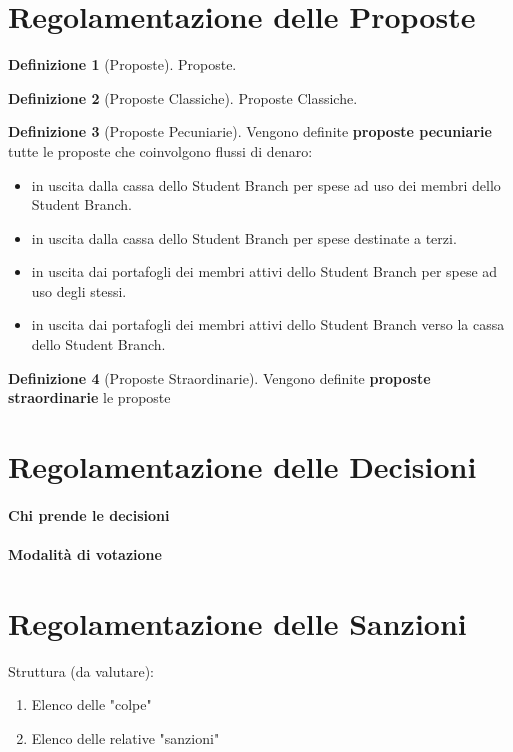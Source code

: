 \documentclass[]{article}
\theoremstyle{definition}
\newtheorem{defn}{Definizione}[section]
\begin{document}
\section{Regolamentazione delle Proposte}


\begin{defn}[Proposte]
	Proposte.
\end{defn}

\begin{defn}[Proposte Classiche]
	Proposte Classiche.
\end{defn}

\begin{defn}[Proposte Pecuniarie]
	Vengono definite \textbf{proposte pecuniarie} tutte le proposte che coinvolgono flussi di denaro:
	\begin{itemize}
		\item in uscita dalla cassa dello Student Branch per spese ad uso dei membri dello Student Branch.
		\item in uscita dalla cassa dello Student Branch per spese destinate a terzi.
		\item in uscita dai portafogli dei membri attivi dello Student Branch per spese ad uso degli stessi. %
		\item in uscita dai portafogli dei membri attivi dello Student Branch verso la cassa dello Student Branch.
	\end{itemize}
\end{defn}

\begin{defn}[Proposte Straordinarie]
	Vengono definite \textbf{proposte straordinarie} le proposte
\end{defn}


\section{Regolamentazione delle Decisioni}

\paragraph{Chi prende le decisioni}

\paragraph{Modalità di votazione}

\section{Regolamentazione delle Sanzioni}

Struttura (da valutare):
\begin{enumerate}
	\item Elenco delle "colpe"
	\item Elenco delle relative "sanzioni"
\end{enumerate}
\end{document}
